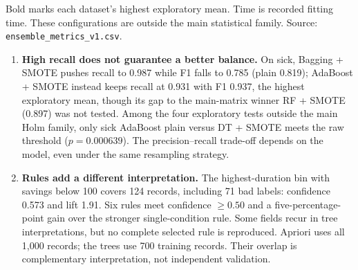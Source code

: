 Bold marks each dataset's highest exploratory mean. Time is recorded
fitting time. These configurations are outside the main statistical family. Source:
\texttt{ensemble\_metrics\_v1.csv}.

\begin{enumerate}
\item \textbf{High recall does not guarantee a better balance.} On sick, Bagging +
SMOTE pushes recall to 0.987 while F1 falls to 0.785 (plain 0.819); AdaBoost + SMOTE
instead keeps recall at 0.931 with F1 0.937, the highest exploratory mean, though its
gap to the main-matrix winner RF + SMOTE (0.897) was not tested. Among the four
exploratory tests outside the main Holm family, only sick AdaBoost plain versus DT +
SMOTE meets the raw threshold ($p = 0.000639$). The precision--recall trade-off
depends on the model, even under the same resampling strategy.
\item \textbf{Rules add a different interpretation.} The highest-duration bin with
savings below 100 covers 124 records, including 71 bad labels: confidence 0.573 and
lift 1.91. Six rules meet confidence $\geq 0.50$ and a five-percentage-point gain over
the stronger single-condition rule. Some fields recur in tree interpretations, but no
complete selected rule is reproduced. Apriori uses all 1,000 records; the trees use
700 training records. Their overlap is complementary interpretation, not independent
validation.
\end{enumerate}

